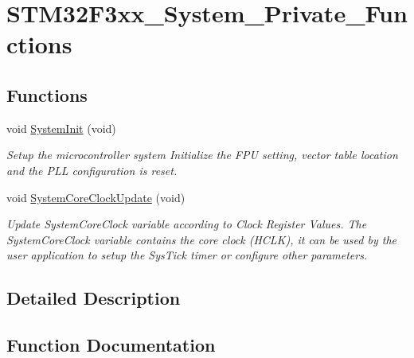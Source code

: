 \hypertarget{group___s_t_m32_f3xx___system___private___functions}{}\section{S\+T\+M32\+F3xx\+\_\+\+System\+\_\+\+Private\+\_\+\+Functions}
\label{group___s_t_m32_f3xx___system___private___functions}
\subsection*{Functions}
\begin{DoxyCompactItemize}
\item 
void \hyperlink{group___s_t_m32_f3xx___system___private___functions_ga93f514700ccf00d08dbdcff7f1224eb2}{System\+Init} (void)
\begin{DoxyCompactList}\small\item\em Setup the microcontroller system Initialize the F\+P\+U setting, vector table location and the P\+L\+L configuration is reset. \end{DoxyCompactList}\item 
void \hyperlink{group___s_t_m32_f3xx___system___private___functions_gae0c36a9591fe6e9c45ecb21a794f0f0f}{System\+Core\+Clock\+Update} (void)
\begin{DoxyCompactList}\small\item\em Update System\+Core\+Clock variable according to Clock Register Values. The System\+Core\+Clock variable contains the core clock (H\+C\+L\+K), it can be used by the user application to setup the Sys\+Tick timer or configure other parameters. \end{DoxyCompactList}\end{DoxyCompactItemize}


\subsection{Detailed Description}


\subsection{Function Documentation}
\hypertarget{group___s_t_m32_f3xx___system___private___functions_gae0c36a9591fe6e9c45ecb21a794f0f0f}{}
